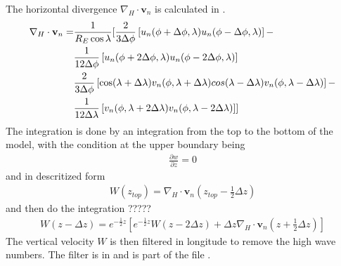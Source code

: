 The horizontal divergence $\nabla_H \cdot \mathbf{v}_n $ is
calculated in .
%
\begin{align}
  \nabla_H \cdot \mathbf{v}_n = & \frac{1}{R_E \cos \lambda} [ \frac{2}{3 \Delta \phi}\left[ u_n(\phi+ \Delta \phi,\lambda)
    u_n(\phi- \Delta \phi,\lambda)\right] - \notag \\
    {}&  \frac{1}{12 \Delta \phi}\left[ u_n(\phi+ 2\Delta \phi,\lambda)
    u_n(\phi- 2\Delta \phi,\lambda)\right] \notag \\
  {} & \frac{2}{3 \Delta \phi}\left[ \cos (\lambda + \Delta \lambda) v_n(\phi,\lambda + \Delta \lambda)
    cos (\lambda - \Delta \lambda) v_n(\phi,\lambda - \Delta \lambda)\right]
    - \notag \\
   {} & \frac{1}{12 \Delta \lambda}\left[ v_n(\phi,\lambda+2\Delta \lambda)
    v_n(\phi,\lambda-2 \Delta \lambda)\right]]
\end{align}
%
The integration is done by an integration from the top to the bottom of
the model, with the condition at the upper boundary being
%
\begin{align}
  \frac{\partial w}{\partial z} = 0
\end{align}
%
and in descritized form
%
\begin{align}
  W(z_{top}) = \nabla_H \cdot \mathbf{v}_n(z_{top}-\frac{1}{2} \Delta z)
\end{align}
%
and then do the integration ?????
%
\begin{align}
  W(z - \Delta z) = e^{-\frac{1}{2}z}\left[e^{-\frac{1}{2}z}W(z - 2\Delta z)+ \Delta z
  \nabla_H \cdot \mathbf{v}_n(z+\frac{1}{2} \Delta
  z)\right]
\end{align}
%
The vertical velocity $W$ is then filtered in longitude to remove
the high wave numbers. The filter is in 
and is part of the file .
